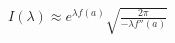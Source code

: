 \documentclass[preview]{standalone}
\begin{document}
\begin{align*}
I(\lambda) \approx \displaystyle e^{\lambda f(a)} \sqrt{\frac{2\pi}{-\lambda f''(a)}}
\end{align*}
\end{document}
